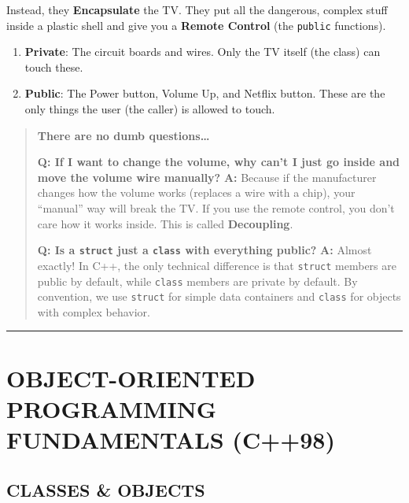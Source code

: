 Instead, they \textbf{Encapsulate} the TV. They put all the dangerous,
complex stuff inside a plastic shell and give you a \textbf{Remote
Control} (the \passthrough{\lstinline!public!} functions).

\begin{enumerate}
\def\labelenumi{\arabic{enumi}.}
\tightlist
\item
  \textbf{Private}: The circuit boards and wires. Only the TV itself
  (the class) can touch these.
\item
  \textbf{Public}: The Power button, Volume Up, and Netflix button.
  These are the only things the user (the caller) is allowed to touch.
\end{enumerate}

\begin{quote}
\textbf{There are no dumb questions\ldots{}}

\textbf{Q: If I want to change the volume, why can't I just go inside
and move the volume wire manually?} \textbf{A:} Because if the
manufacturer changes how the volume works (replaces a wire with a chip),
your ``manual'' way will break the TV. If you use the remote control,
you don't care how it works inside. This is called \textbf{Decoupling}.

\textbf{Q: Is a \passthrough{\lstinline!struct!} just a
\passthrough{\lstinline!class!} with everything public?} \textbf{A:}
Almost exactly! In C++, the only technical difference is that
\passthrough{\lstinline!struct!} members are public by default, while
\passthrough{\lstinline!class!} members are private by default. By
convention, we use \passthrough{\lstinline!struct!} for simple data
containers and \passthrough{\lstinline!class!} for objects with complex
behavior.
\end{quote}

\begin{center}\rule{0.5\linewidth}{0.5pt}\end{center}

\hypertarget{object-oriented-programming-fundamentals-c98}{%
\section{OBJECT-ORIENTED PROGRAMMING FUNDAMENTALS
(C++98)}\label{object-oriented-programming-fundamentals-c98}}

\hypertarget{classes-objects}{%
\subsection{CLASSES \& OBJECTS}\label{classes-objects}}

